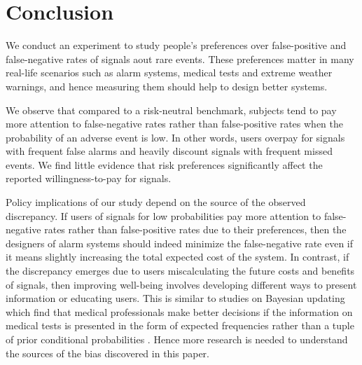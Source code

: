\documentclass[12pt,a4paper]{article}
\begin{document}
\section{Conclusion}

We conduct an experiment to study people's preferences over false-positive and false-negative rates of signals aout rare events.  These preferences matter in many real-life scenarios such as alarm systems, medical tests and extreme weather warnings, and hence measuring them should help to design better systems.

We observe that compared to a risk-neutral benchmark, subjects tend to pay more attention to false-negative rates rather than false-positive rates when the probability of an adverse event is low. In other words, users overpay for signals with frequent false alarms and heavily discount signals with frequent missed events. We find little evidence that risk preferences significantly affect the reported willingness-to-pay for signals.  

Policy implications of our study depend on the source of the observed discrepancy. If users of signals for low probabilities pay more attention to false-negative rates rather than false-positive rates due to their preferences, then the designers of alarm systems should indeed minimize the false-negative rate even if it means slightly increasing the total expected cost of the system. In contrast, if the discrepancy emerges due to users miscalculating the future costs and benefits of signals, then improving well-being involves developing different ways to present information or educating users. This is similar to studies on Bayesian updating which find that medical professionals make better decisions if the information on medical tests is presented in the form of expected frequencies rather than a tuple of prior conditional probabilities \citep{hoffrage_natural_2015, mcdowell_meta-analysis_2017}. Hence more research is needed to understand the sources of the bias discovered in this paper.



 

\vspace{20pt}



\clearpage
\end{document}
